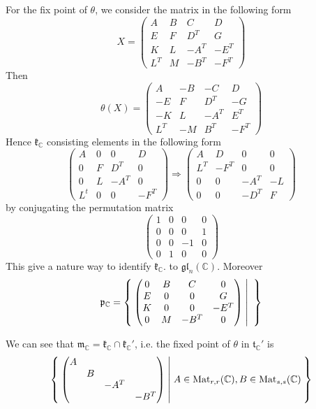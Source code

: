 \documentclass[12pt]{amsart}
\def\Mat{{\rm Mat}}
\def\bC{{\mathbb{C}}}
\def\agl{\mathfrak{gl}}
\def\fpp{\mathfrak{p}}
\def\ftt{\mathfrak{t}}
\def\fkk{\mathfrak{k}}
\def\fmm{\mathfrak{m}}
\def\Mat{\mathrm{Mat}}
\begin{document}
For the fix point of $\theta$, we consider the matrix in the following form
\[
X = \begin{pmatrix}
  A & B & C & D\\
  E & F & {D}^{T} & G\\
  K & L & -{A}^{T} & -{E}^{T}\\
  {L}^{T} & M & -{B}^{T} & -{F}^{T}
\end{pmatrix}
\]
Then 
\[
\theta(X) = 
\begin{pmatrix}
  A & -B & -C & D\\
  -E & F & {D}^{T} & -G\\
  -K & L & -{A}^{T} & {E}^{T}\\
  {L}^{T} & -M & {B}^{T} & -{F}^{T}
\end{pmatrix}
\]
Hence $\fkk_\bC$ consisting elements in the following form
\[
\begin{pmatrix}
  A & 0 & 0 & D\\
  0 & F & {D}^{T} & 0\\
  0 & L & -{A}^{T} & 0\\
 {L}^{t} & 0 & 0 & -{F}^{T}
\end{pmatrix}
\Rightarrow
\begin{pmatrix}
  A & D & 0 & 0\\
  {L}^{T} & -{F}^{T} & 0 & 0\\
  0 & 0 & -{A}^{T} & -L\\
  0 & 0 & -{D}^{T} & F
\end{pmatrix}
\]
by conjugating the permutation matrix
\[
\begin{pmatrix}
  1 & 0 & 0 & 0\\
  0 & 0 & 0 & 1\\
  0 & 0 & -1 & 0\\
  0 & 1 & 0 & 0
\end{pmatrix}
\]
This give a nature way to identify $\fkk_\bC$. to $\agl_n(\bC)$.
Moreover 
\[
\fpp_\bC = \Set{
\begin{pmatrix}
  0 & B & C & 0\\
 E & 0 & 0 & G\\
 K & 0 & 0 & -{E}^{T}\\
 0 & M & -{B}^{T} & 0
\end{pmatrix}
|
}
\]


We can see that $\fmm_\bC = \fkk_\bC \cap \fkk_\bC'$, i.e. 
the fixed point of $\theta$ in $\ftt_\bC'$ is 
\[
\Set{\begin{pmatrix}
    A & & & \\
    & B & & \\
    & & -A^T &\\
    & & & -B^T 
  \end{pmatrix}|
  A\in \Mat_{r,r}(\bC), B\in \Mat_{s,s}(\bC)
}
\]
\end{document}
